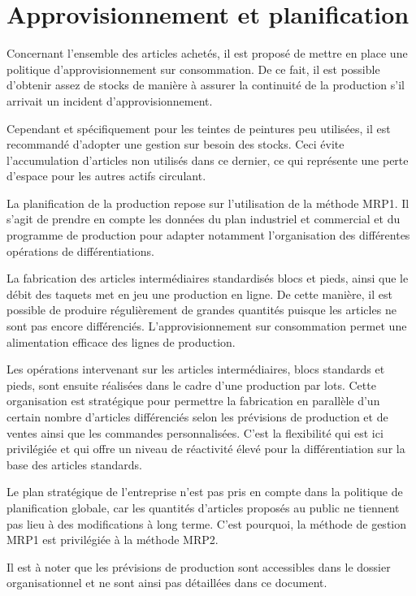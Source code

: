 \section{Approvisionnement et planification}

Concernant l'ensemble des articles achetés, il est proposé de mettre en place
une politique d'approvisionnement sur consommation. De ce fait,
il est possible d'obtenir assez de stocks de manière à assurer la continuité
de la production s'il arrivait un incident d'approvisionnement.

Cependant et spécifiquement pour les teintes de peintures peu utilisées,
il est recommandé d'adopter une gestion sur besoin des stocks.
Ceci évite l'accumulation d'articles non utilisés dans ce dernier, ce qui
représente une perte d'espace pour les autres actifs circulant.

La planification de la production repose sur l'utilisation de la méthode
MRP1. Il s'agit de prendre en compte les données du plan industriel et
commercial et du programme de production pour adapter notamment 
l'organisation des différentes opérations de différentiations.

La fabrication des articles intermédiaires standardisés blocs et pieds, ainsi
que le débit des taquets met en jeu une production en ligne. De cette manière,
il est possible de produire régulièrement de grandes quantités puisque
les articles ne sont pas encore différenciés. L'approvisionnement
sur consommation permet une alimentation efficace des lignes de production.

Les opérations intervenant sur les articles intermédiaires, blocs standards et
pieds, sont ensuite réalisées dans le cadre d'une production par lots.
Cette organisation est stratégique pour permettre la fabrication en parallèle
d'un certain nombre d'articles différenciés selon les prévisions de
production et de ventes ainsi que les commandes personnalisées.
C'est la flexibilité qui est ici privilégiée et qui offre un niveau de
réactivité élevé pour la différentiation sur la base des articles standards.

Le plan stratégique de l'entreprise n'est pas pris en compte dans la politique
de planification globale, car les quantités d'articles proposés au public
ne tiennent pas lieu à des modifications à long terme. C'est pourquoi,
la méthode de gestion MRP1 est privilégiée à la méthode MRP2.

Il est à noter que les prévisions de production sont accessibles 
dans le dossier organisationnel et ne sont ainsi pas détaillées
dans ce document.
